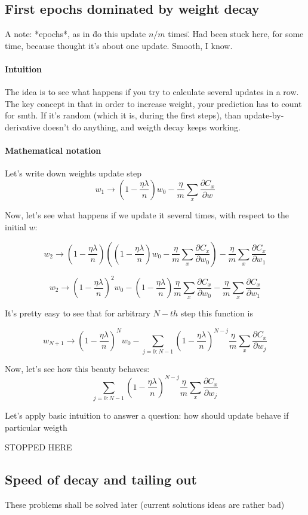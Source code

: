 \documentclass{article}
\begin{document}
\subsection{First epochs dominated by weight decay}

A note: *epochs*, as in \"do this update $n/m$ times\".
Had been stuck here, for some time, because thought it's about one update. Smooth, I know.

\paragraph{Intuition}
The idea is to see what happens if you try to calculate several updates in a row.
The key concept in that in order to increase weight, your prediction has to count for smth.
If it's random (which it is, during the first steps), than update-by-derivative doesn't do anything, and weigth decay keeps working.
\paragraph{Mathematical notation}
Let's write down weights update step
$$ w_{1} \rightarrow \left(1-\frac{\eta \lambda}{n}\right) w_{0} -\frac{\eta}{m}
  \sum_x \frac{\partial C_x}{\partial w}$$

Now, let's see what happens if we update it several times, with respect to the initial $w$:

$$ w_{2} \rightarrow (1-\frac{\eta \lambda}{n})(
(1-\frac{\eta \lambda}{n}) w_{0} -\frac{\eta}{m} \sum_x \frac{\partial C_x}{\partial w_{0}}
) -\frac{\eta}{m} \sum_x \frac{\partial C_x}{\partial w_{1}}$$

$$ w_{2} \rightarrow (1-\frac{\eta \lambda}{n})^{2} w_{0} - (1-\frac{\eta \lambda}{n}) \frac{\eta}{m} \sum_x \frac{\partial C_x}{\partial w_{0}} - 
\frac{\eta}{m} \sum_x \frac{\partial C_x}{\partial w_{1}}$$

It's pretty easy to see that for arbitrary $N-th$ step this function is

$$ w_{N+1} \rightarrow (1-\frac{\eta \lambda}{n})^{N} w_{0} - \sum_{j = 0:N-1} (1-\frac{\eta \lambda}{n})^{N-j} \frac{\eta}{m} \sum_x \frac{\partial C_x}{\partial w_{j}}$$

Now, let's see how this beauty behaves:
$$\sum_{j = 0:N-1} (1-\frac{\eta \lambda}{n})^{N-j} \frac{\eta}{m} \sum_x \frac{\partial C_x}{\partial w_{j}}$$

Let's apply basic intuition to answer a question: how should update behave if particular weigth 

STOPPED HERE

\subsection{Speed of decay and tailing out}
These problems shall be solved later (current solutions ideas are rather bad)
\end{document}
